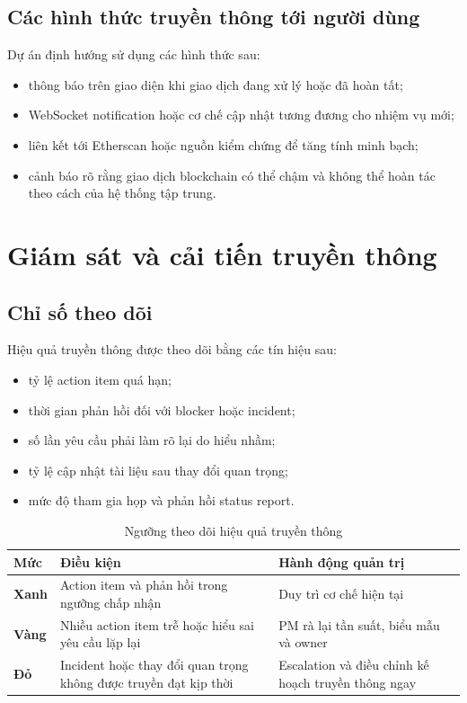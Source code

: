 \subsection{Các hình thức truyền thông tới người dùng}

Dự án định hướng sử dụng các hình thức sau:

\begin{itemize}
  \item thông báo trên giao diện khi giao dịch đang xử lý hoặc đã hoàn tất;
  \item WebSocket notification hoặc cơ chế cập nhật tương đương cho nhiệm vụ mới;
  \item liên kết tới Etherscan hoặc nguồn kiểm chứng để tăng tính minh bạch;
  \item cảnh báo rõ rằng giao dịch blockchain có thể chậm và không thể hoàn tác theo cách của hệ thống tập trung.
\end{itemize}

\section{Giám sát và cải tiến truyền thông}

\subsection{Chỉ số theo dõi}

Hiệu quả truyền thông được theo dõi bằng các tín hiệu sau:

\begin{itemize}
  \item tỷ lệ action item quá hạn;
  \item thời gian phản hồi đối với blocker hoặc incident;
  \item số lần yêu cầu phải làm rõ lại do hiểu nhầm;
  \item tỷ lệ cập nhật tài liệu sau thay đổi quan trọng;
  \item mức độ tham gia họp và phản hồi status report.
\end{itemize}

\begin{table}[H]
\centering
\caption{Ngưỡng theo dõi hiệu quả truyền thông}
\label{tab:communication-thresholds}
\begin{tabularx}{\textwidth}{| >{\bfseries}p{2.8cm} | p{4.5cm} | X |}
\hline
Mức & Điều kiện & Hành động quản trị \\
\hline
Xanh & Action item và phản hồi trong ngưỡng chấp nhận & Duy trì cơ chế hiện tại \\ \hline
Vàng & Nhiều action item trễ hoặc hiểu sai yêu cầu lặp lại & PM rà lại tần suất, biểu mẫu và owner \\ \hline
Đỏ & Incident hoặc thay đổi quan trọng không được truyền đạt kịp thời & Escalation và điều chỉnh kế hoạch truyền thông ngay \\
\hline
\end{tabularx}
\end{table}

